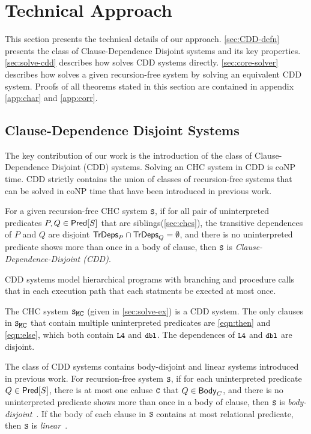 \section{Technical Approach}
\label{sec:approach}
%
This section presents the technical details of our approach.
%
\autoref{sec:CDD-defn} presents the class of Clause-Dependence Disjoint
systems and its key properties.
%
\autoref{sec:solve-cdd} describes how \sys solves CDD systems
directly.
%
\autoref{sec:core-solver} describes how \sys solves a given
recursion-free system by solving an equivalent CDD system.
%
Proofs of all theorems stated in this section are contained in appendix
\autoref{app:char} and \autoref{app:corr}.

\subsection{Clause-Dependence Disjoint Systems}
\label{sec:CDD-defn}
%
The key contribution of our work is the introduction of the class of
Clause-Dependence Disjoint (CDD) systems.
%
Solving an CHC system in CDD is coNP time.
%
CDD strictly contains
the union of classes of recursion-free systems that can be solved
in coNP time that have been introduced in previous work.
%
\begin{defn}
  \label{defn:cdds}
  For a given recursion-free CHC system $\cc{S}$,
  if for all pair of uninterpreted predicates $P, Q \in \mathsf{Pred}[ S ]$ that are siblings(\autoref{sec:chcs}), the 
  transitive dependences of $P$ and $Q$ are disjoint $\mathsf{TrDeps}_{P} \cap \mathsf{TrDeps}_{Q} = \emptyset$, and there is 
  no uninterpreted predicate shows more than once in a body of clause, then $\cc{S}$ is
  \emph{Clause-Dependence-Disjoint (CDD)}.
\end{defn}
%
CDD systems model hierarchical programs with branching and
procedure calls that in each execution path that each statments be
exected at most once.
%
\begin{ex}
  The CHC system $\mcchc$ (given in \autoref{sec:solve-ex}) is a CDD
  system.
  The only clauses in $\mcchc$ that contain multiple uninterpreted
  predicates are \autoref{eqn:then} and \autoref{eqn:else}, which both
  contain $\cc{L4}$ and $\cc{dbl}$.
  The dependences of $\cc{L4}$ and $\cc{dbl}$ are disjoint.
\end{ex}

The class of CDD systems contains body-disjoint and linear
systems introduced in previous work.
%
For recursion-free system $\cc{S}$, if for each uninterpreted predicate
$Q \in \mathsf{Pred}[ S ]$, there is at most one caluse $\cc{C}$ that $Q \in \mathsf{Body}_{C}$,
and there is no uninterpreted predicate shows more than once in a body of clause, then
$\cc{S}$ is \emph{body-disjoint}~\cite{rummer13a,rummer13b}.
%
If the body of each clause in $\cc{S}$ contains at most
relational predicate, then $\cc{S}$ is
\emph{linear}~\cite{albarghouthi12a}.


